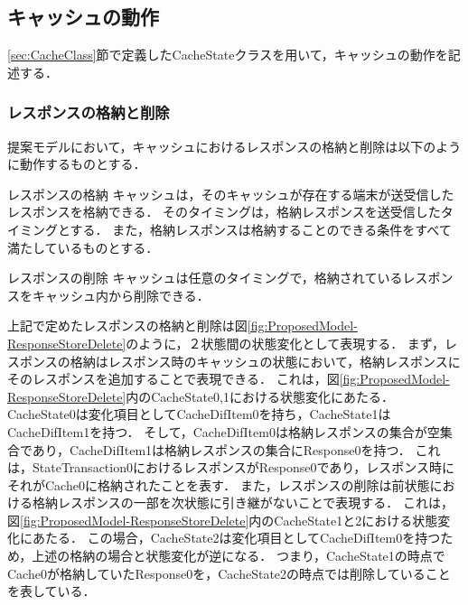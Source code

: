 \documentclass[12pt,a4paper]{jbook}
\begin{document}
\subsection{キャッシュの動作}
\ref{sec:CacheClass}節で定義したCacheStateクラスを用いて，キャッシュの動作を記述する．

\subsubsection{レスポンスの格納と削除}
提案モデルにおいて，キャッシュにおけるレスポンスの格納と削除は以下のように動作するものとする．

\begin{itembox}[l]{レスポンスの格納}
キャッシュは，そのキャッシュが存在する端末が送受信したレスポンスを格納できる．
そのタイミングは，格納レスポンスを送受信したタイミングとする．
また，格納レスポンスは格納することのできる条件をすべて満たしているものとする．
\end{itembox}

\begin{itembox}[l]{レスポンスの削除}
キャッシュは任意のタイミングで，格納されているレスポンスをキャッシュ内から削除できる．
\end{itembox}

上記で定めたレスポンスの格納と削除は図\ref{fig:ProposedModel-ResponseStoreDelete}のように，２状態間の状態変化として表現する．
まず，レスポンスの格納はレスポンス時のキャッシュの状態において，格納レスポンスにそのレスポンスを追加することで表現できる．
これは，図\ref{fig:ProposedModel-ResponseStoreDelete}内のCacheState0,1における状態変化にあたる．
CacheState0は変化項目としてCacheDifItem0を持ち，CacheState1はCacheDifItem1を持つ．
そして，CacheDifItem0は格納レスポンスの集合が空集合であり，CacheDifItem1は格納レスポンスの集合にResponse0を持つ．
これは，StateTransaction0におけるレスポンスがResponse0であり，レスポンス時にそれがCache0に格納されたことを表す．
また，レスポンスの削除は前状態における格納レスポンスの一部を次状態に引き継がないことで表現する．
これは，図\ref{fig:ProposedModel-ResponseStoreDelete}内のCacheState1と2における状態変化にあたる．
この場合，CacheState2は変化項目としてCacheDifItem0を持つため，上述の格納の場合と状態変化が逆になる．
つまり，CacheState1の時点でCache0が格納していたResponse0を，CacheState2の時点では削除していることを表している．
\end{document}

